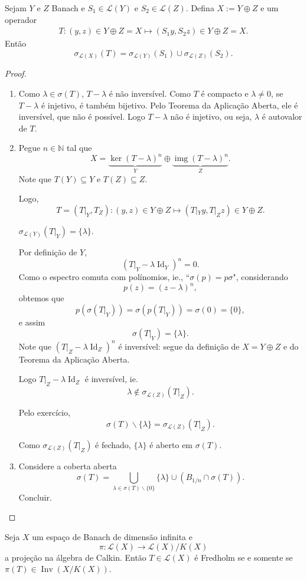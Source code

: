 \documentclass[portuguese]{article}
\theoremstyle{definition}
\newcommand{\N}{\mathbb{N}}
\DeclareMathOperator{\img}{img}
\DeclareMathOperator{\Id}{Id}
\begin{document}
\begin{exer*}
	Sejam $Y$ e $Z$ Banach e $S_1\in\mathcal{L}(Y)$ e $S_2\in\mathcal{L}(Z)$. Defina $X:=Y\oplus Z$ e um operador
	\begin{align*}
		T:(y,z)\in Y\oplus Z=X\mapsto(S_1y,S_2z)\in Y\oplus Z=X.
	\end{align*}
	Então
	\[\sigma_{\mathcal{L}(X)}(T)=\sigma_{\mathcal{L}(Y)}(S_1)\cup\sigma_{\mathcal{L}(Z)}(S_2).\]
\end{exer*}
\begin{proof}\leavevmode
	\begin{enumerate}
		\item Como $\lambda\in\sigma(T)$, $T-\lambda$ é não inversível. Como $T$ é compacto e $\lambda\neq0$, se $T-\lambda$ é injetivo, é também bijetivo. Pelo Teorema da Aplicação Aberta, ele é inversível, que não é possível. Logo $T-\lambda$ não é injetivo, ou seja, $\lambda$ é autovalor de $T$.
		
		\item Pegue $n\in\N$ tal que
		\[X=\underbrace{\ker(T-\lambda)^n}_Y\oplus\underbrace{\img(T-\lambda)^n}_Z.\]
		Note que $T(Y)\subseteq Y$ e $T(Z)\subseteq Z$.
		
		Logo,
		\[T=(T|_Y,T_Z):(y,z)\in Y\oplus Z\mapsto(T|_Yy,T|_Zz)\in Y\oplus Z.\]
		
		\begin{af*}
			$\sigma_{\mathcal{L}(Y)}(T|_Y)=\{\lambda\}$.
		\end{af*}
		Por definição de $Y$,
		\[(T|_Y-\lambda\Id_Y)^n=0.\]
		Como o espectro comuta com polínomios, ie., ``$\sigma(p)=p\sigma$", considerando
		\[p(z)=(z-\lambda)^n,\]
		obtemos que
		\[p(\sigma(T|_Y))=\sigma(p(T|_Y))=\sigma(0)=\{0\},\]
		e assim
		\[\sigma(T|_Y)=\{\lambda\}.\]
		Note que $(T|_Z-\lambda\Id_Z)^n$ é inversível: segue da definição de $X=Y\oplus Z$ e do Teorema da Aplicação Aberta.
		
		Logo $T|_Z-\lambda\Id_Z$ é inversível, ie.
		\[\lambda\notin\sigma_{\mathcal{L}(Z)}(T|_Z).\]
		
		Pelo exercício,
		\[\sigma(T)\backslash\{\lambda\}=\sigma_{\mathcal{L}(Z)}(T|_Z).\]
		
		Como $\sigma_{\mathcal{L}(Z)}(T|_Z)$ é fechado, $\{\lambda\}$ é aberto em $\sigma(T)$.
		
		\item Considere a coberta aberta
		\[\sigma(T)=\bigcup_{\lambda\in\sigma(T)\backslash\{0\}}\{\lambda\}\cup(B_{1/n}\cap\sigma(T)).\]
		{\color{orange}Concluir.}
	\end{enumerate}
\end{proof}
\begin{teo}[Atkinson]\label{teo:atkinson}
	Seja $X$ um espaço de Banach de dimensão infinita e
	\[\pi:\mathcal{L}(X)\to\mathcal{L}(X)/K(X)\]
	a projeção na álgebra de Calkin. Então $T\in\mathcal{L}(X)$ é Fredholm se e somente se $\pi (T)\in\operatorname{Inv}(X/K(X))$.
\end{teo}
\end{document}
